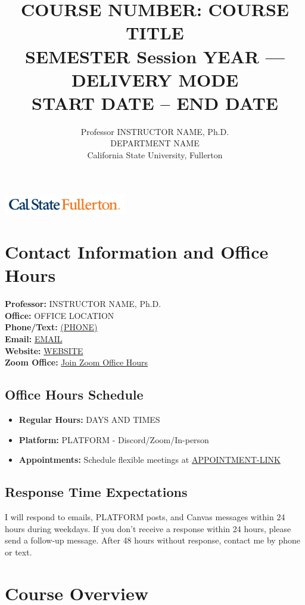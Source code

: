 \documentclass[11pt]{scrartcl} %
\title{\textbf{COURSE NUMBER: COURSE TITLE}\\ 
       \large SEMESTER Session YEAR --- DELIVERY MODE\\
       \normalsize START DATE -- END DATE}
\author{Professor INSTRUCTOR NAME, Ph.D.\\
        DEPARTMENT NAME\\
        California State University, Fullerton}
\date{}
\begin{document}
\maketitle

\begin{center}
\includegraphics[width=0.4\textwidth]{csuf_logo.png}
\end{center}

\section{Contact Information and Office Hours}

\textbf{Professor:} INSTRUCTOR NAME, Ph.D.\\
\textbf{Office:} OFFICE LOCATION\\
\textbf{Phone/Text:} \href{tel:+1PHONE}{(PHONE)}\\
\textbf{Email:} \href{mailto:EMAIL}{EMAIL}\\
\textbf{Website:} \href{https://WEBSITE}{WEBSITE}\\
\textbf{Zoom Office:} \href{https://ZOOM-LINK}{Join Zoom Office Hours}

\subsection{Office Hours Schedule}
\begin{itemize}
\item \textbf{Regular Hours:} DAYS AND TIMES
\item \textbf{Platform:} PLATFORM - Discord/Zoom/In-person
\item \textbf{Appointments:} Schedule flexible meetings at \href{https://APPOINTMENT-LINK}{APPOINTMENT-LINK}
\end{itemize}

\subsection{Response Time Expectations}
I will respond to emails, PLATFORM posts, and Canvas messages within 24 hours during weekdays. If you don't receive a response within 24 hours, please send a follow-up message. After 48 hours without response, contact me by phone or text.

\section{Course Overview}
\end{document}
